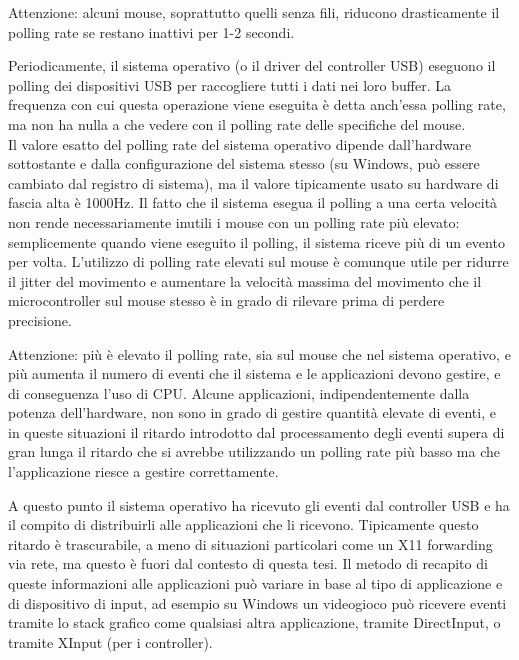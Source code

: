 Attenzione: alcuni mouse, soprattutto quelli senza fili, riducono drasticamente il polling rate se restano inattivi per 1-2 secondi.

Periodicamente, il sistema operativo (o il driver del controller USB) eseguono il polling dei dispositivi USB per raccogliere tutti i dati nei loro buffer. La frequenza con cui questa operazione viene eseguita è detta anch'essa polling rate, ma non ha nulla a che vedere con il polling rate delle specifiche del mouse.\\
Il valore esatto del polling rate del sistema operativo dipende dall'hardware sottostante e dalla configurazione del sistema stesso (su Windows, può essere cambiato dal registro di sistema), ma il valore tipicamente usato su hardware di fascia alta è 1000Hz. Il fatto che il sistema esegua il polling a una certa velocità non rende necessariamente inutili i mouse con un polling rate più elevato: semplicemente quando viene eseguito il polling, il sistema riceve più di un evento per volta. L'utilizzo di polling rate elevati sul mouse è comunque utile per ridurre il jitter del movimento e aumentare la velocità massima del movimento che il microcontroller sul mouse stesso è in grado di rilevare prima di perdere precisione.

Attenzione: più è elevato il polling rate, sia sul mouse che nel sistema operativo, e più aumenta il numero di eventi che il sistema e le applicazioni devono gestire, e di conseguenza l'uso di CPU. Alcune applicazioni, indipendentemente dalla potenza dell'hardware, non sono in grado di gestire quantità elevate di eventi, e in queste situazioni il ritardo introdotto dal processamento degli eventi supera di gran lunga il ritardo che si avrebbe utilizzando un polling rate più basso ma che l'applicazione riesce a gestire correttamente.

A questo punto il sistema operativo ha ricevuto gli eventi dal controller USB e ha il compito di distribuirli alle applicazioni che li ricevono. Tipicamente questo ritardo è trascurabile, a meno di situazioni particolari come un X11 forwarding via rete, ma questo è fuori dal contesto di questa tesi. Il metodo di recapito di queste informazioni alle applicazioni può variare in base al tipo di applicazione e di dispositivo di input, ad esempio su Windows un videogioco può ricevere eventi tramite lo stack grafico come qualsiasi altra applicazione, tramite DirectInput, o tramite XInput (per i controller).


